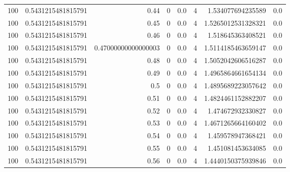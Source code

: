 \documentclass[11pt]{article}
\begin{document}
\begin{center}
\begin{tabular}{rrrrrrrr}
100 & 0.5431215481815791 & 0.44 & 0 & 0.0 & 4 & 1.534077694235589 & 0.0\\
100 & 0.5431215481815791 & 0.45 & 0 & 0.0 & 4 & 1.5265012531328321 & 0.0\\
100 & 0.5431215481815791 & 0.46 & 0 & 0.0 & 4 & 1.518645363408521 & 0.0\\
100 & 0.5431215481815791 & 0.47000000000000003 & 0 & 0.0 & 4 & 1.5114185463659147 & 0.0\\
100 & 0.5431215481815791 & 0.48 & 0 & 0.0 & 4 & 1.5052042606516287 & 0.0\\
100 & 0.5431215481815791 & 0.49 & 0 & 0.0 & 4 & 1.4965864661654134 & 0.0\\
100 & 0.5431215481815791 & 0.5 & 0 & 0.0 & 4 & 1.4895689223057642 & 0.0\\
100 & 0.5431215481815791 & 0.51 & 0 & 0.0 & 4 & 1.4824461152882207 & 0.0\\
100 & 0.5431215481815791 & 0.52 & 0 & 0.0 & 4 & 1.474672932330827 & 0.0\\
100 & 0.5431215481815791 & 0.53 & 0 & 0.0 & 4 & 1.4671265664160402 & 0.0\\
100 & 0.5431215481815791 & 0.54 & 0 & 0.0 & 4 & 1.459578947368421 & 0.0\\
100 & 0.5431215481815791 & 0.55 & 0 & 0.0 & 4 & 1.451081453634085 & 0.0\\
100 & 0.5431215481815791 & 0.56 & 0 & 0.0 & 4 & 1.4440150375939846 & 0.0\\
\hline
\end{tabular}
\end{center}
\end{document}
